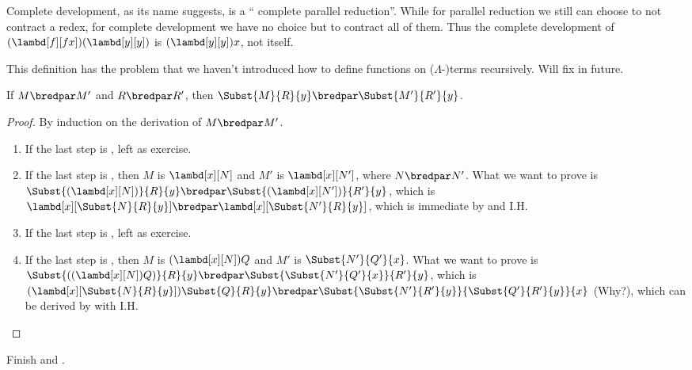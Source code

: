 \documentclass[../../../include/open-logic-section]{subfiles}
\begin{document}
Complete development, as its name suggests, is a ``
complete parallel reduction''. While for parallel reduction we still can choose
to not contract a redex, for complete development we have no choice
but to contract all of them. Thus the complete
development of $(\lambd[f][fx])(\lambd[y][y])$ is
$(\lambd[y][y])x$, not itself.

\begin{editorial}
  This definition has the problem that we haven't introduced how to
  define functions on ($\Lambda$-)terms recursively. Will fix in future.
\end{editorial}

\begin{lem}
  If $M \bredpar M'$ and $R \bredpar R'$, then $\Subst{M}{R}{y}
  \bredpar \Subst{M'}{R'}{y}$.
\end{lem}
\begin{proof}
  By induction on the derivation of $M \bredpar M'$.
  \begin{enumerate}
    \item If the last step is , left as exercise. 
    \item If the last step is , then $M$ is 
      $\lambd[x][N]$ and $M'$ is $\lambd[x][N']$,
      where $N \bredpar N'$. What we want to prove is
      $\Subst{(\lambd[x][N])}{R}{y} \bredpar
      \Subst{(\lambd[x][N'])}{R'}{y}$, which is
      $\lambd[x][\Subst{N}{R}{y}] \bredpar
      \lambd[x][\Subst{N'}{R}{y}]$, which is immediate by
       and I.H.
    \item If the last step is , left as exercise. 
    \item If the last step is , then $M$ is
      $(\lambd[x][N])Q$ and $M'$ is $\Subst{N'}{Q'}{x}$. What
      we want to prove is $\Subst{((\lambd[x][N])Q)}{R}{y}
      \bredpar \Subst{\Subst{N'}{Q'}{x}}{R'}{y}$, which is
      $(\lambd[x][\Subst{N}{R}{y}])\Subst{Q}{R}{y} \bredpar
      \Subst{\Subst{N'}{R'}{y}}{\Subst{Q'}{R'}{y}}{x}$ (Why?), which
      can be derived by  with I.H.
  \end{enumerate}
\end{proof}

\begin{prob}
  Finish  and .
\end{prob}
\end{document}

